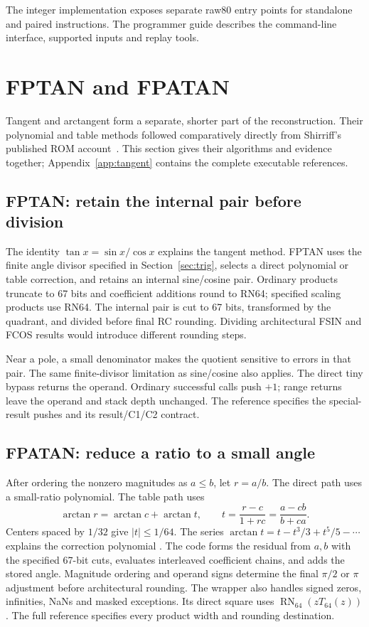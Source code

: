 \documentclass[11pt]{article}
\newcommand{\N}[1]{\operatorname{RN}_{#1}}
\begin{document}
The integer implementation exposes separate raw80 entry points for standalone
and paired instructions. The programmer guide describes the command-line
interface, supported inputs and replay tools.

\clearpage
\section{FPTAN and FPATAN}
\label{family:tangent}

Tangent and arctangent form a separate, shorter part of the reconstruction.
Their polynomial and table methods followed comparatively directly from
Shirriff's published ROM account~\cite{shirriff2025rom}. This section gives
their algorithms and evidence together; Appendix~\ref{app:tangent} contains
the complete executable references.

\subsection{FPTAN: retain the internal pair before division}

The identity $\tan x=\sin x/\cos x$ explains the tangent method. FPTAN
uses the finite angle divisor specified in Section~\ref{sec:trig}, selects a direct polynomial or table
correction, and retains an internal sine/cosine pair. Ordinary products
truncate to 67 bits and coefficient additions round to RN64; specified
scaling products use RN64. The internal pair is cut to 67 bits, transformed
by the quadrant, and divided before final RC rounding. Dividing architectural
FSIN and FCOS results would introduce different rounding steps.

Near a pole, a small denominator makes the quotient sensitive to errors in
that pair. The same finite-divisor limitation as sine/cosine also applies.
The direct tiny bypass returns the operand. Ordinary successful calls push
$+1$; range returns leave the operand and stack depth unchanged. The reference
specifies the special-result pushes and its result/C1/C2 contract.

\subsection{FPATAN: reduce a ratio to a small angle}
\label{sec:atan}

After ordering the nonzero magnitudes as $a\leq b$, let $r=a/b$. The direct
path uses a small-ratio polynomial. The table path uses
\begin{equation}
 \arctan r=\arctan c+\arctan t,\qquad
 t=\frac{r-c}{1+rc}=\frac{a-cb}{b+ca}.
\end{equation}
Centers spaced by $1/32$ give $|t|\leq1/64$. The series
$\arctan t=t-t^3/3+t^5/5-\cdots$ explains the correction polynomial
\cite[Section~4.24]{dlmfElementary}. The code forms the residual from $a,b$
with the specified 67-bit cuts, evaluates interleaved coefficient chains,
and adds the stored angle. Magnitude ordering and operand signs determine
the final $\pi/2$ or $\pi$ adjustment before architectural rounding.
The wrapper also handles signed zeros, infinities, NaNs and masked exceptions.
Its direct square uses $\N{64}(zT_{64}(z))$. The full reference specifies
every product width and rounding destination.
\end{document}
